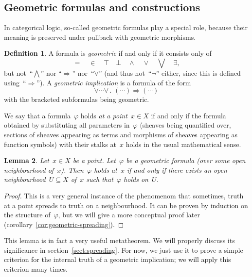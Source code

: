 \documentclass[10pt]{amsart}
\theoremstyle{definition}
\newtheorem{defn}{Definition}[section]
\theoremstyle{plain}
\newtheorem{lemma}[defn]{Lemma}
\theoremstyle{remark}
\newcommand{\?}{\,{:}\,}
\renewcommand{\_}{\mathpunct{.}\,}
\begin{document}


\subsection{Geometric formulas and constructions} In categorical logic,
so-called geometric formulas play a special role, because their meaning is
preserved under pullback with geometric morphisms. %
\begin{defn}A formula is \emph{geometric} if and only if it consists only of
\[ {=} \quad {\in} \quad {\top} \quad {\bot} \quad {\wedge} \quad {\vee} \quad
{\bigvee} \quad {\exists}, \]
but not~``$\bigwedge$'' nor ``$\Rightarrow$'' nor~``$\forall$'' (and thus
not~``$\neg$'' either, since this is defined using~``$\Rightarrow$'').
A \emph{geometric implication} is a formula of the form
\[ \forall \cdots \forall\_ (\cdots) \Rightarrow (\cdots) \]
with the bracketed subformulas being geometric.
\end{defn}
We say that a formula~$\varphi$ holds \emph{at a point~$x \in X$} if and only
if the formula obtained by substituting all parameters in~$\varphi$ (sheaves
being quantified over, sections of sheaves appearing as terms and morphisms of
sheaves appearing as function symbols) with their stalks at~$x$ holds in the usual
mathematical sense.

\begin{lemma}\label{lemma:geometric-stalk-neighbourhood}
Let~$x \in X$ be a point. Let~$\varphi$ be a geometric formula (over some open
neighbourhood of~$x$).
Then~$\varphi$ holds at~$x$ if and only if there exists an open neighbourhood~$U
\subseteq X$ of~$x$ such that~$\varphi$ holds on~$U$.
\end{lemma}
\begin{proof}This is a very general instance of the phenomenom that sometimes,
truth at a point spreads to truth on a neighbourhood. It can be proven by
induction on the structure of~$\varphi$, but we will give a more conceptual
proof later (corollary~\ref{cor:geometric-spreading}).
\end{proof}

This lemma is in fact a very useful metatheorem. We will properly discuss its
significance in section~\ref{sect:spreading}. For now, we just use it to prove a
simple criterion for the internal truth of a geometric implication; we will
apply this criterion many times.
\end{document}
